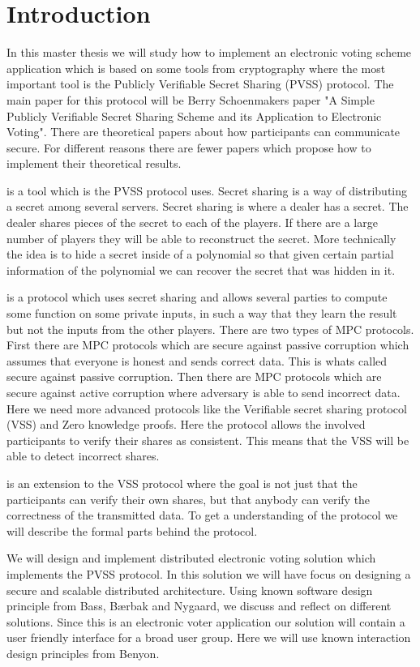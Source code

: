 \section{Introduction}
In this master thesis we will study how to implement an  electronic voting scheme application which is based on some tools from cryptography where the most important tool is the Publicly Verifiable Secret Sharing (PVSS) protocol. The main paper for this protocol will be Berry Schoenmakers paper "A Simple Publicly Verifiable Secret Sharing Scheme and its Application to Electronic Voting". There are theoretical papers about how participants can communicate secure. For different reasons there are fewer papers which propose how to implement their theoretical results. 


 is a tool which is the PVSS protocol uses. Secret sharing is a way of distributing a secret among several servers. Secret sharing is where a dealer has a secret. The dealer shares pieces of the secret to each of the players. If there are a large number of players they will be able to reconstruct the secret. More technically the idea is to hide a secret inside of a polynomial so that given certain partial information of the polynomial we can recover the secret that was hidden in it.

 is a protocol which uses secret sharing and allows several parties to compute some function on some private inputs, in such a way that they learn the result but not the inputs from the other players. There are two types of MPC protocols. First there are MPC protocols which are secure against passive corruption which assumes that everyone is honest and sends correct data. This is whats called secure against passive corruption. Then there are MPC protocols which are secure against active corruption where adversary is able to send incorrect data. Here we need more advanced protocols like the Verifiable secret sharing protocol (VSS) and Zero knowledge proofs. Here the protocol allows the involved participants to verify their shares as consistent. This means that the VSS will be able to detect incorrect shares.

 is an extension to the VSS protocol where the goal is not just that the participants can verify their own shares, but that anybody can verify the correctness of the transmitted data. To get a understanding of the protocol we will describe the formal parts behind the protocol. 

 We will design and implement distributed electronic voting solution which implements the PVSS protocol. In this solution we will have focus on designing a secure and scalable distributed architecture. Using known software design principle from Bass, Bærbak and Nygaard, we discuss and reflect on different solutions. Since this is an electronic voter application our solution will contain a user friendly interface for a broad user group. Here we will use known interaction design principles from Benyon.

